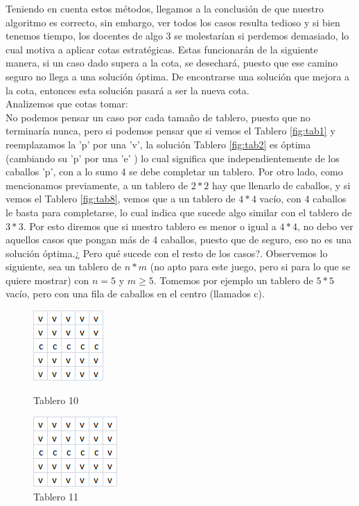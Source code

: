 Teniendo en cuenta estos métodos, llegamos a la conclusión de que nuestro algoritmo es correcto, sin embargo, ver todos los casos resulta tedioso y si bien tenemos tiempo, los docentes de algo 3 se molestarían si perdemos demasiado, lo cual motiva a aplicar cotas estratégicas. Estas funcionarán de la siguiente manera, si un caso dado supera a la cota, se desechará, puesto que ese camino seguro no llega a una solución óptima. De encontrarse una solución que mejora a la cota, entonces esta solución pasará a ser la nueva cota.\\
Analizemos que cotas tomar:\\
No podemos pensar un caso por cada tamaño de tablero, puesto que no terminaría nunca, pero si podemos pensar que si vemos el Tablero \ref{fig:tab1} y reemplazamos la 'p' por una 'v', la solución Tablero \ref{fig:tab2} es óptima (cambiando su 'p' por una 'e' ) lo cual significa que independientemente de los caballos 'p', con a lo sumo 4 se debe completar un tablero. Por otro lado, como mencionamos previamente, a un tablero de $2*2$ hay que llenarlo de caballos, y si vemos el Tablero \ref{fig:tab8}, vemos que a un tablero de $4*4$ vacío, con 4 caballos le basta para completarse, lo cual indica que sucede algo similar con el tablero de $3*3$. Por esto diremos que si nuestro tablero es menor o igual a $4*4$, no debo ver aquellos casos que pongan más de 4 caballos, puesto que de seguro, eso no es una solución óptima.¿ Pero qué sucede con el resto de los casos?. Observemos lo siguiente, sea un tablero de $n*m$ (no apto para este juego, pero si para lo que se quiere mostrar) con  $n=5$ y $m\geq5$. Tomemos por ejemplo un tablero de $5*5$ vacío, pero con una fila de caballos en el centro (llamados c).


\begin{figure}[!htb]
  \includegraphics[scale=1]{imagenes/tab10.png}
  \caption{Tablero 10}\label{fig:tab10}
\endminipage
{}
  \includegraphics[scale=1]{imagenes/tab11.png}
  \caption{Tablero 11}\label{fig:tab11}
\endminipage
\end{figure}

